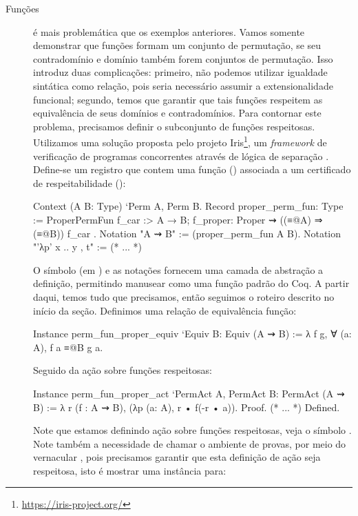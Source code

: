 \begin{description}
	\item[Funções] é mais problemática que os exemplos anteriores. Vamos somente demonstrar que funções formam um conjunto de permutação, se seu contradomínio e domínio também forem conjuntos de permutação. Isso introduz duas complicações: primeiro, não podemos utilizar igualdade sintática como relação, pois seria necessário assumir a extensionalidade funcional; segundo, temos que garantir que tais funções respeitem as equivalência de seus domínios e contradomínios. 
	Para contornar este problema, precisamos definir o subconjunto de funções respeitosas. Utilizamos uma solução proposta pelo projeto Iris\footnote{\url{https://iris-project.org/}}, um \textit{framework} de verificação de programas concorrentes através de lógica de separação \cite{Jung2015,Jung2016}. Define-se um registro que contem uma função () associada a um certificado de respeitabilidade ():
	\begin{coqcode}
Context (A B: Type) `{Perm A, Perm B}.
Record proper_perm_fun: Type := ProperPermFun {
   f_car :> A → B;
   f_proper: Proper ⇝ ((≡@{A}) ⇒ (≡@{B})) f_car
}.
Notation "A ⇝ B" := (proper_perm_fun A B).
Notation "'λp' x .. y , t" := (* ... *)
	\end{coqcode}
	O símbolo \coqinline{:>} (em ) e as notações fornecem uma camada de abstração a definição, permitindo manusear  como uma função padrão do Coq. A partir daqui, temos tudo que precisamos, então seguimos o roteiro descrito no início da seção. Definimos uma relação de equivalência função:
	\begin{coqcode}
Instance perm_fun_proper_equiv `{Equiv B}: Equiv (A ⇝ B) := 
   λ f g, ∀ (a: A), f a ≡@{B} g a.
	\end{coqcode}
	Seguido da ação sobre funções respeitosas:
	\begin{coqcode}
Instance perm_fun_proper_act `{PermAct A, PermAct B}: PermAct (A ⇝ B) :=
   λ r (f : A ⇝ B), (λp (a: A), r • f(-r • a)).
Proof. (* ... *) Defined.
	\end{coqcode}
	Note que estamos definindo ação sobre funções respeitosas, veja o símbolo . Note também a necessidade de chamar o ambiente de provas, por meio do vernacular , pois precisamos garantir que esta definição de ação seja respeitosa, isto é mostrar uma instância para:

\end{description}
